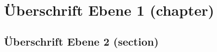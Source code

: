 




\chapter{Überschrift Ebene 1 (chapter)}
\label{chap:UeberschriftenEbenen}

\section{Überschrift Ebene 2 (section)}
\vspace{1.5mm} %

